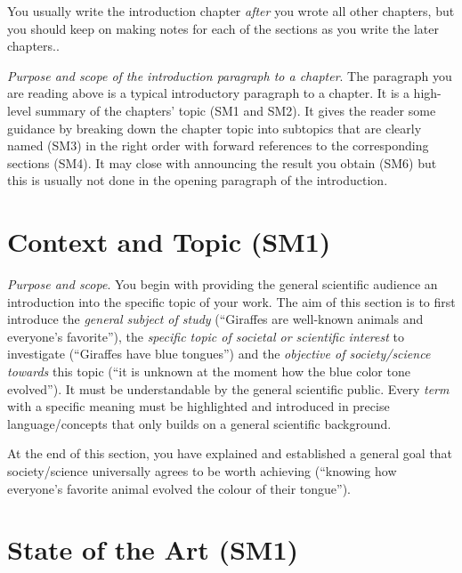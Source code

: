 \documentclass[
  fontsize=10pt
  numbers=noenddot,
  english,  %
  paper=a5,
  twoside,  %
  DIV=calc,
  headings=small,
  bibliography=totoc,
  listof=totoc,
  draft=false
]{scrbook}
\theoremstyle{break}
\begin{document}
You usually write the introduction chapter \emph{after} you wrote all other chapters, but you should keep on making notes for each of the sections as you write the later chapters..

\emph{Purpose and scope of the introduction paragraph to a chapter}. The paragraph you are reading above is a typical introductory paragraph to a chapter. It is a high-level summary of the chapters' topic (SM1 and SM2). It gives the reader some guidance by breaking down the chapter topic into subtopics that are clearly named (SM3) in the right order with forward references to the corresponding sections (SM4). It may close with announcing the result you obtain (SM6) but this is usually not done in the opening paragraph of the introduction.

\section{Context and Topic (SM1)}\label{sec:introduction:topic}

\emph{Purpose and scope}. You begin with providing the general scientific audience an introduction into the specific topic of your work. The aim of this section is to first introduce the \emph{general subject of study} (``Giraffes are well-known animals and everyone's favorite''), the \emph{specific topic of societal or scientific interest} to investigate (``Giraffes have blue tongues'') and the \emph{objective of society/science towards} this topic (``it is unknown at the moment how the blue color tone evolved'').
It must be understandable by the general scientific public. Every \emph{term} with a specific meaning must be highlighted and introduced in precise language/concepts that only builds on a general scientific background.

At the end of this section, you have explained and established a general goal that society/science universally agrees to be worth achieving (``knowing how everyone's favorite animal evolved the colour of their tongue'').

\section{State of the Art (SM1)}\label{sec:introduction:state-of-art}
\end{document}
